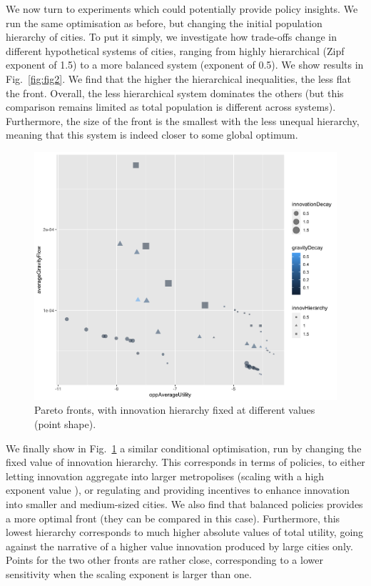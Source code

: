 \documentclass[final,5p,times,twocolumn,authoryear]{elsarticle}
\begin{document}
We now turn to experiments which could potentially provide policy insights. We run the same optimisation as before, but changing the initial population hierarchy of cities. To put it simply, we investigate how trade-offs change in different hypothetical systems of cities, ranging from highly hierarchical (Zipf exponent of 1.5) to a more balanced system (exponent of 0.5). We show results in Fig.~\ref{fig:fig2}. We find that the higher the hierarchical inequalities, the less flat the front. Overall, the less hierarchical system dominates the others (but this comparison remains limited as total population is different across systems). Furthermore, the size of the front is the smallest with the less unequal hierarchy, meaning that this system is indeed closer to some global optimum.




\begin{figure}
	\centering
	\includegraphics[width=\linewidth]{figures/pareto-oppAverageUtility-averageGravityFlow_VARYINGINNOVHIERARCHY_color-gravityDecay_size-innovationDecay.png}
	\caption{Pareto fronts, with innovation hierarchy fixed at different values (point shape).\label{fig:fig3}}
\end{figure}

We finally show in Fig.~\ref{fig:fig3} a similar conditional optimisation, run by changing the fixed value of innovation hierarchy. This corresponds in terms of policies, to either letting innovation aggregate into larger metropolises (scaling with a high exponent value \cite{pumain2006evolutionary}), or regulating and providing incentives to enhance innovation into smaller and medium-sized cities. We also find that balanced policies provides a more optimal front (they can be compared in this case). Furthermore, this lowest hierarchy corresponds to much higher absolute values of total utility, going against the narrative of a higher value innovation produced by large cities only. Points for the two other fronts are rather close, corresponding to a lower sensitivity when the scaling exponent is larger than one.
\end{document}
